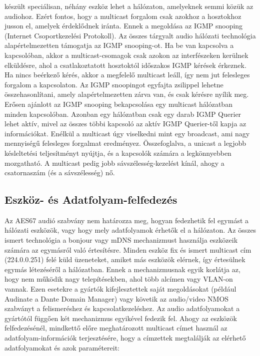készült speciálisan, néhány eszköz lehet a hálózaton, amelyeknek semmi közük az audiohoz.
Ezért fontos, hogy a multicast forgalom csak
azokhoz a hosztokhoz jusson el, amelyek érdeklődnek iránta. Ennek a megoldása az
IGMP snooping (Internet Csoportkezelési Protokoll). 
Az összes tárgyalt audio hálózati technológia alapértelmezetten
támogatja az IGMP snooping-ot. Ha be van kapcsolva a kapcsolóban, akkor a
multicast-csomagok csak azokon az interfészeken kerülnek elküldésre, ahol a
csatlakoztatott hosztoktól időszakos IGMP kérések érkeznek. Ha nincs beérkező
kérés, akkor a megfelelő multicast leáll, így nem jut felesleges forgalom a
kapcsolaton. Az IGMP snoopingot egyfajta zsilippel lehetne összehasonlítani,
amely alapértelmezetten zárva van, és csak kérésre nyílik meg. Erősen ajánlott
az IGMP snooping bekapcsolása egy multicast hálózatban minden kapcsolóban.
Azonban egy hálózatban csak egy darab IGMP Querier lehet aktív, mivel az
összes többi kapcsoló az aktív IGMP Querier-től kapja az információkat.
Enélkül a multicast úgy viselkedni mint egy broadcast, ami nagy mennyiségű
felesleges forgalmat eredményez.
Összefoglalva, a unicast a legjobb késleltetési teljesítményt nyújtja, és a
kapcsolók számára a legkönnyebben mozgatható.
A multicast pedig jobb sávszélesség-kezelést kínál, ahogy a csatornaszám (és a sávszélesség) nő.

\subsection{Eszköz- és Adatfolyam-felfedezés}

Az AES67 audió szabvány nem határozza meg, hogyan fedezhetik fel egymást a
hálózati eszközök, vagy hogy mely adatfolyamok érhetők el a hálózaton.
Az összes ismert technológia a bonjour vagy mDNS mechanizmust használja eszközeik számára
az egymásról való értesítésre. 
Minden eszköz fix és ismert multicast cím (224.0.0.251) felé küld
üzeneteket, amiket más eszközök elérnek, így értesülnek egymás létezéséről a hálózatban.
Ennek a mechanizmusnak egyik korlátja az, hogy nem működik nagy telepítésekben,
ahol több alcímen vagy VLAN-on vannak. Ezen esetekre a gyártók kifejlesztettek
saját megoldásokat (például Audinate a Dante Domain Manager) vagy
követik az audio/video NMOS szabványt a felismeréshez és kapcsolatkezeléshez.
Az audio adatfolyamokat a gyártótól függően két mechanizmus egyikével fedezik fel. Ahogy
az eszközök felfedezésénél, mindkettő előre meghatározott multicast címet
használ az adatfolyam-információk terjesztésére, hogy a címzettek megtalálják az
elérhető adatfolyamokat és azok paramétereit:

